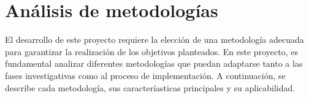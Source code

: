 \documentclass{article}
\title{}
\author{}
\date{}
\begin{document}
\maketitle

\section{Análisis de metodologías}
El desarrollo de este proyecto requiere la elección de una metodología adecuada para garantizar la realización de los objetivos planteados.
En este proyecto, es fundamental analizar diferentes metodologías que puedan adaptarse tanto a las fases investigativas como al proceso de implementación.
A continuación, se describe cada metodología, sus caracteríasticas principales y su aplicabilidad.  

\subsection{}
\end{document}
